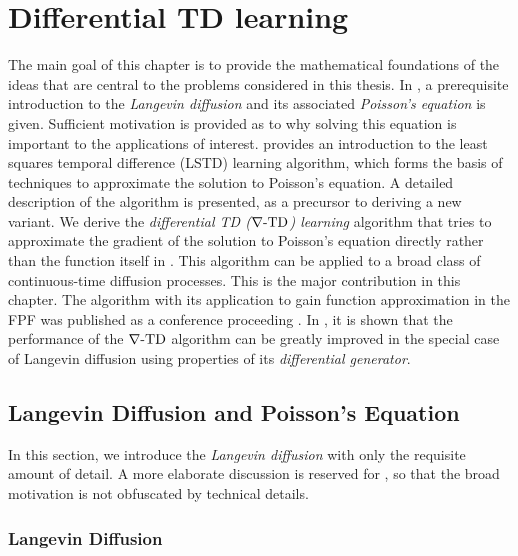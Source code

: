 \chapter{Differential TD learning} %
\label{ch:diff_td}
The main goal of this chapter is to provide the mathematical foundations of the ideas that are central to the problems considered in this thesis.
In , a prerequisite introduction to the \textit{Langevin diffusion} and its associated \textit{Poisson's equation} is given. Sufficient motivation is provided as to why solving this equation is important to the applications of interest.  provides an introduction to the least squares temporal difference (LSTD) learning algorithm, which forms the basis of techniques to approximate the solution to Poisson's equation. A detailed description of the algorithm is presented, as a precursor to deriving a new variant. We derive the \textit{differential TD ($\nabla\text{-TD}$) learning} algorithm that tries to approximate the gradient of the solution to Poisson's equation directly rather than the function itself in . This algorithm can be applied to 	a broad class of continuous-time diffusion processes. This is the major contribution in this chapter. The algorithm with its application to gain function approximation in the FPF was published as a conference proceeding \cite{raddevmey16}. In , it is shown that the performance of the $\nabla\text{-TD}$ algorithm can be greatly improved in the special case of Langevin diffusion using properties of its \textit{differential generator}. 

\section{Langevin Diffusion and Poisson's Equation}
\label{s:langevin_diffusion}
In this section, we introduce the \textit{Langevin diffusion} with only the requisite amount of detail. A more elaborate discussion is reserved for , so that the broad motivation is not obfuscated by  technical details.  %

\subsection{Langevin Diffusion}

